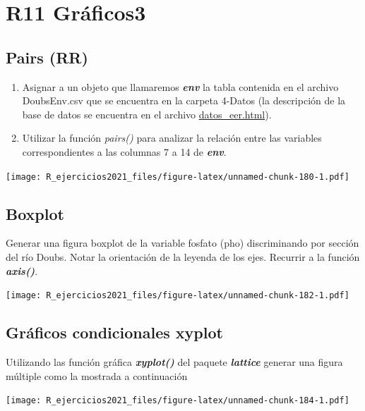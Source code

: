 \documentclass[]{book}
\begin{document}
\hypertarget{r11-gruxe1ficos3}{%
\chapter*{R11 Gráficos3}\label{r11-gruxe1ficos3}}

\hypertarget{pairs-rr}{%
\section{Pairs (RR)}\label{pairs-rr}}

\begin{enumerate}
\def\labelenumi{\arabic{enumi}.}
\item
  Asignar a un objeto que llamaremos \textbf{\emph{env}} la tabla contenida en el archivo DoubsEnv.csv que se encuentra en la carpeta 4-Datos (la descripción de la base de datos se encuentra en el archivo \url{datos_eer.html}).
\item
  Utilizar la función \emph{pairs()} para analizar la relación entre las variables correspondientes a las columnas 7 a 14 de \textbf{\emph{env}}.
\end{enumerate}

\texttt{[image: R\_ejercicios2021\_files/figure-latex/unnamed-chunk-180-1.pdf]}

\hypertarget{boxplot}{%
\section{Boxplot}\label{boxplot}}

Generar una figura boxplot de la variable fosfato (pho) discriminando por sección del río Doubs. Notar la orientación de la leyenda de los ejes. Recurrir a la función \emph{\textbf{axis()}}.

\texttt{[image: R\_ejercicios2021\_files/figure-latex/unnamed-chunk-182-1.pdf]}

\hypertarget{gruxe1ficos-condicionales-xyplot}{%
\section{Gráficos condicionales xyplot}\label{gruxe1ficos-condicionales-xyplot}}

Utilizando las función gráfica \emph{\textbf{xyplot()}} del paquete \emph{\textbf{lattice}} generar una figura múltiple como la mostrada a continuación

\texttt{[image: R\_ejercicios2021\_files/figure-latex/unnamed-chunk-184-1.pdf]}
\end{document}
